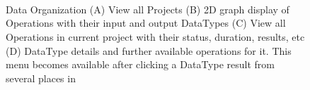  \begin{figure}[!htbp]

    \centering
    \\
    \\
    \\
    \caption{\TVB Data Organization
    (A) View all Projects
    (B) 2D graph display of Operations with their input and output DataTypes 
    (C) View all Operations in current project with their status, duration, results, etc
    (D) DataType details and further available operations for it. This menu becomes available after clicking a DataType result from several places in \TVB }
        \label{fig:project}
\end{figure}

